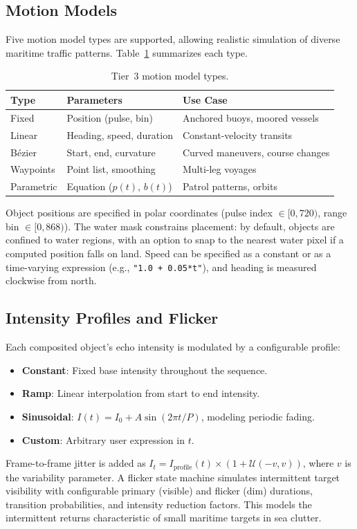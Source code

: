 \documentclass[conf]{new-aiaa}
\begin{document}
\subsection{Motion Models}
Five motion model types are supported, allowing realistic simulation of diverse maritime traffic patterns. Table~\ref{tab:motion_models} summarizes each type.

\begin{table}[htb]
\centering
\caption{Tier~3 motion model types.}
\label{tab:motion_models}
\begin{tabular}{@{}lll@{}}
\toprule
\textbf{Type} & \textbf{Parameters} & \textbf{Use Case} \\
\midrule
Fixed & Position (pulse, bin) & Anchored buoys, moored vessels \\
Linear & Heading, speed, duration & Constant-velocity transits \\
B\'{e}zier & Start, end, curvature & Curved maneuvers, course changes \\
Waypoints & Point list, smoothing & Multi-leg voyages \\
Parametric & Equation ($p(t)$, $b(t)$) & Patrol patterns, orbits \\
\bottomrule
\end{tabular}
\end{table}

Object positions are specified in polar coordinates (pulse index $\in [0, 720)$, range bin $\in [0, 868)$). The water mask constrains placement: by default, objects are confined to water regions, with an option to snap to the nearest water pixel if a computed position falls on land. Speed can be specified as a constant or as a time-varying expression (e.g., \texttt{"1.0 + 0.05*t"}), and heading is measured clockwise from north.

\subsection{Intensity Profiles and Flicker}
Each composited object's echo intensity is modulated by a configurable profile:
\begin{itemize}
    \item \textbf{Constant}: Fixed base intensity throughout the sequence.
    \item \textbf{Ramp}: Linear interpolation from start to end intensity.
    \item \textbf{Sinusoidal}: $I(t) = I_0 + A\sin(2\pi t / P)$, modeling periodic fading.
    \item \textbf{Custom}: Arbitrary user expression in $t$.
\end{itemize}
Frame-to-frame jitter is added as $I_t = I_{\mathrm{profile}}(t) \times (1 + \mathcal{U}(-v, v))$, where $v$ is the variability parameter. A flicker state machine simulates intermittent target visibility with configurable primary (visible) and flicker (dim) durations, transition probabilities, and intensity reduction factors. This models the intermittent returns characteristic of small maritime targets in sea clutter.
\end{document}
